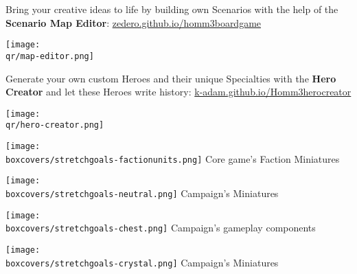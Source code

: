 \begin{multicols}{2}
\begin{itemize}
    \begin{minipage}{5cm}
        \item Bring your creative ideas to life by building own Scenarios with the help of the \textbf{Scenario Map Editor}:
        {\footnotesize \href{https://zedero.github.io/homm3boardgame/}{zedero.github.io/homm3boardgame}}
    \end{minipage}
    \hfill
    \begin{minipage}{2cm}
        \begin{center}
            \texttt{[image: \\qr/map-editor.png]}
            \scriptsize {}
        \end{center}
    \end{minipage}\par
    \smallskip
    \begin{minipage}{5cm}
    \item Generate your own custom Heroes and their unique Specialties with the \textbf{Hero Creator} and let these Heroes write history:
      \mbox{\footnotesize \href{https://k-adam.github.io/Homm3_hero_creator}{k-adam.github.io/Homm3\textunderscore{}hero\textunderscore{}creator}}
    \end{minipage}
    \hfill
    \begin{minipage}{2cm}
        \begin{center}
            \texttt{[image: \\qr/hero-creator.png]}
            \scriptsize {}
        \end{center}
    \end{minipage}\par
  \end{itemize}
\end{multicols}
\begin{multicols}{4}
    \begin{center}
        \texttt{[image: \\boxcovers/stretchgoals-factionunits.png]}\newline
        \footnotesize Core game's Faction Miniatures\par
        \columnbreak
        \texttt{[image: \\boxcovers/stretchgoals-neutral.png]}\newline
        \footnotesize {} Campaign's Miniatures\par
        \columnbreak
        \texttt{[image: \\boxcovers/stretchgoals-chest.png]}\newline
        \footnotesize {} Campaign's gameplay components\par
        \columnbreak
        \texttt{[image: \\boxcovers/stretchgoals-crystal.png]}\newline
        \footnotesize {} Campaign's Miniatures\par
    \end{center}
\end{multicols}

